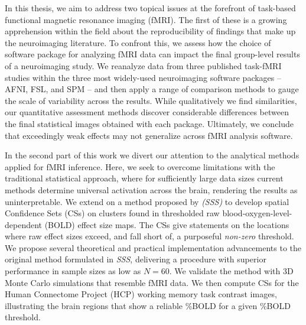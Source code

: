 \documentclass[11pt,a4paper]{report}      %
\begin{document}

 \thesistitlepage                     %

\begin{thesisabstract}
\begin{singlespace}
In this thesis, we aim to address two topical issues at the forefront of task-based functional magnetic resonance imaging (fMRI). The first of these is a growing apprehension within the field about the reproducibility of findings that make up the neuroimaging literature. To confront this, we assess how the choice of software package for analyzing fMRI data can impact the final group-level results of a neuroimaging study. We reanalyze data from three published task-fMRI studies within the three most widely-used neuroimaging software packages -- AFNI, FSL, and SPM -- and then apply a range of comparison methods to gauge the scale of variability across the results. While qualitatively we find similarities, our quantitative assessment methods discover considerable differences between the final statistical images obtained with each package. Ultimately, we conclude that exceedingly weak effects may not generalize across fMRI analysis software. 

In the second part of this work we divert our attention to the analytical methods applied for fMRI inference. Here, we seek to overcome limitations with the traditional statistical approach, where for sufficiently large data sizes current methods determine universal activation across the brain, rendering the results as uninterpretable. We extend on a method proposed by \textit{\citet*{Sommerfeld2018-zl}} \textit{(SSS)} to develop spatial Confidence Sets (CSs) on clusters found in thresholded raw blood-oxygen-level-dependent (BOLD) effect size maps. The CSs give statements on the locations where raw effect sizes exceed, and fall short of, a purposeful \textit{non-zero} threshold. We propose several theoretical and practical implementation advancements to the original method formulated in \textit{SSS}, delivering a procedure with superior performance in sample sizes as low as $N = 60$. We validate the method with 3D Monte Carlo simulations that resemble fMRI data. We then compute CSs for the Human Connectome Project (HCP) working memory task contrast images, illustrating the brain regions that show a reliable \%BOLD for a given \%BOLD threshold. 


\end{singlespace}
\end{thesisabstract}
\end{document}
